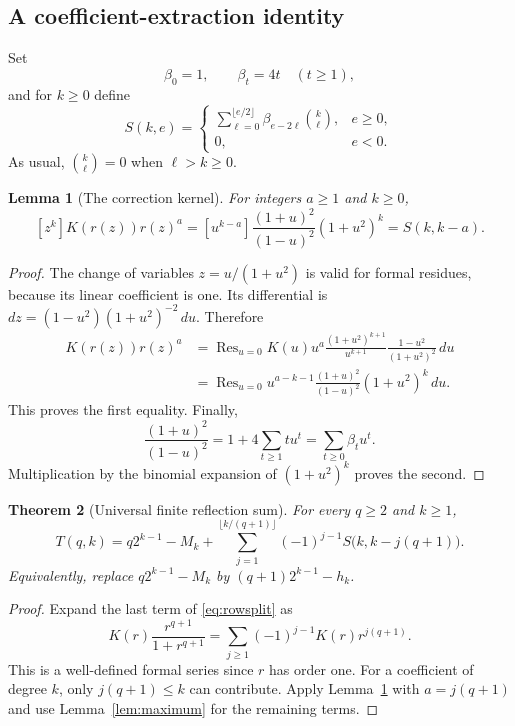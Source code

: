 \documentclass[11pt,letterpaper]{article}
\numberwithin{equation}{section}
\newtheorem{theorem}{Theorem}[section]
\newtheorem{lemma}[theorem]{Lemma}
\theoremstyle{definition}
\newcommand{\coef}[2]{[#1^{#2}]}
\begin{document}
\subsection{A coefficient-extraction identity}
Set
\begin{equation}\label{eq:beta}
\beta_0=1,\qquad \beta_t=4t\quad(t\ge1),
\end{equation}
and for $k\ge0$ define
\begin{equation}\label{eq:S}
S(k,e)=\begin{cases}
\displaystyle\sum_{\ell=0}^{\lfloor e/2\rfloor}
\beta_{e-2\ell}\binom{k}{\ell},&e\ge0,\\[6pt]
0,&e<0.
\end{cases}
\end{equation}
As usual, $\binom{k}{\ell}=0$ when $\ell>k\ge0$.

\begin{lemma}[The correction kernel]\label{lem:kernel}
For integers $a\ge1$ and $k\ge0$,
\begin{equation}\label{eq:kernel}
\coef{z}{k}K(r(z))r(z)^a
=\coef{u}{k-a}\frac{(1+u)^2}{(1-u)^2}(1+u^2)^k
=S(k,k-a).
\end{equation}
\end{lemma}
\begin{proof}
The change of variables $z=u/(1+u^2)$ is valid for formal residues,
because its linear coefficient is one.  Its differential is
$dz=(1-u^2)(1+u^2)^{-2}\,du$.  Therefore
\begin{align*}
\coef{z}{k}K(r(z))r(z)^a
&=\operatorname{Res}_{u=0}
K(u)u^a\frac{(1+u^2)^{k+1}}{u^{k+1}}
\frac{1-u^2}{(1+u^2)^2}\,du\\
&=\operatorname{Res}_{u=0}
u^{a-k-1}\frac{(1+u)^2}{(1-u)^2}(1+u^2)^k\,du.
\end{align*}
This proves the first equality.  Finally,
\[
\frac{(1+u)^2}{(1-u)^2}=1+4\sum_{t\ge1}tu^t
=\sum_{t\ge0}\beta_tu^t.
\]
Multiplication by the binomial expansion of $(1+u^2)^k$ proves the second.
\end{proof}

\begin{theorem}[Universal finite reflection sum]\label{thm:reflection}
For every $q\ge2$ and $k\ge1$,
\begin{equation}\label{eq:universal}
\boxed{\displaystyle
T(q,k)=q2^{k-1}-M_k+
\sum_{j=1}^{\lfloor k/(q+1)\rfloor}
(-1)^{j-1}S\bigl(k,k-j(q+1)\bigr).}
\end{equation}
Equivalently, replace $q2^{k-1}-M_k$ by $(q+1)2^{k-1}-h_k$.
\end{theorem}
\begin{proof}
Expand the last term of \eqref{eq:rowsplit} as
\[
K(r)\frac{r^{q+1}}{1+r^{q+1}}
=\sum_{j\ge1}(-1)^{j-1}K(r)r^{j(q+1)}.
\]
This is a well-defined formal series since $r$ has order one.  For a
coefficient of degree $k$, only $j(q+1)\le k$ can contribute.
Apply Lemma~\ref{lem:kernel} with $a=j(q+1)$ and use
Lemma~\ref{lem:maximum} for the remaining terms.
\end{proof}
\end{document}
